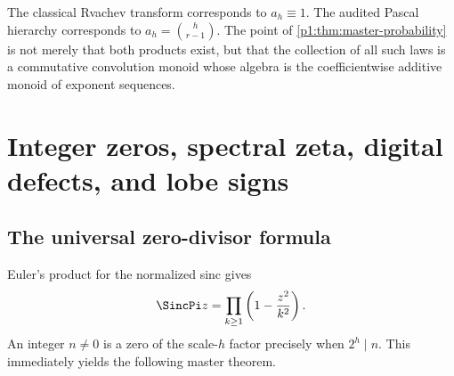 \documentclass[11pt,oneside]{article}
\numberwithin{equation}{section}
\theoremstyle{definition}
\theoremstyle{remark}
\begin{document}
\begin{remark}
The classical Rvachev transform corresponds to $a_h\equiv1$.  The audited Pascal hierarchy
corresponds to $a_h=\binom h{r-1}$.  The point of \cref{p1:thm:master-probability} is not merely
that both products exist, but that the collection of all such laws is a commutative
convolution monoid whose algebra is the coefficientwise additive monoid of exponent
sequences.
\end{remark}

\section{Integer zeros, spectral zeta, digital defects, and lobe signs}
\label{p1:sec:spectrum}

\subsection{The universal zero-divisor formula}

Euler's product for the normalized sinc gives
\[
 \SincPi z=\prod_{k\ge1}\left(1-\frac{z^2}{k^2}\right).
\]
An integer $n\ne0$ is a zero of the scale-$h$ factor precisely when $2^h\mid n$.
This immediately yields the following master theorem.
\end{document}
